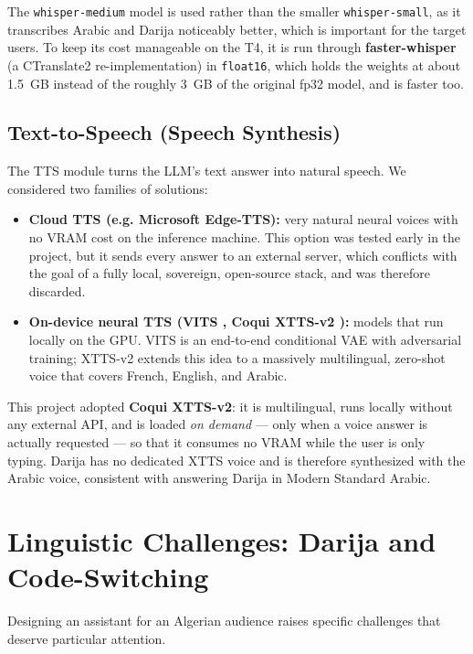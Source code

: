 \documentclass[12pt, a4paper]{report}
\newcommand{\sourced}[1]{#1}        %
\newcommand{\humantext}[1]{#1}      %
\begin{document}
\humantext{The \texttt{whisper-medium} model is used rather than the smaller \texttt{whisper-small}, as it transcribes Arabic and Darija noticeably better, which is important for the target users. To keep its cost manageable on the T4, it is run through \textbf{faster-whisper} (a CTranslate2 re-implementation) in \texttt{float16}, which holds the weights at about 1.5~GB instead of the roughly 3~GB of the original fp32 model, and is faster too.}

\subsection{Text-to-Speech (Speech Synthesis)}
\humantext{The TTS module turns the LLM's text answer into natural speech. We considered two families of solutions:}
\begin{itemize}
    \item \humantext{\textbf{Cloud TTS (e.g. Microsoft Edge-TTS):} very natural neural voices with no VRAM cost on the inference machine. This option was tested early in the project, but it sends every answer to an external server, which conflicts with the goal of a fully local, sovereign, open-source stack, and was therefore discarded.}
    \item \sourced{\textbf{On-device neural TTS (VITS \cite{kim2021vits}, Coqui XTTS-v2 \cite{casanova2024xtts}):} models that run locally on the GPU. VITS is an end-to-end conditional VAE with adversarial training; XTTS-v2 extends this idea to a massively multilingual, zero-shot voice that covers French, English, and Arabic.}
\end{itemize}

\humantext{This project adopted \textbf{Coqui XTTS-v2}: it is multilingual, runs locally without any external API, and is loaded \emph{on demand} --- only when a voice answer is actually requested --- so that it consumes no VRAM while the user is only typing. Darija has no dedicated XTTS voice and is therefore synthesized with the Arabic voice, consistent with answering Darija in Modern Standard Arabic.}

\section{Linguistic Challenges: Darija and Code-Switching}
\humantext{Designing an assistant for an Algerian audience raises specific challenges that deserve particular attention.}
\end{document}
